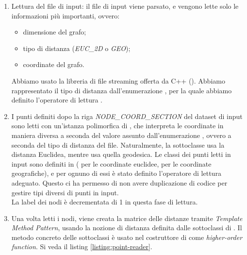 \begin{enumerate}
    \item Lettura del file di input: il file di input viene parsato, e vengono lette solo le informazioni più importanti, ovvero:
    
    \begin{itemize}
        \item dimensione del grafo;
        \item tipo di distanza (\textit{EUC\_2D} o \textit{GEO});
        \item coordinate del grafo.
    \end{itemize}
    
    \noindent Abbiamo usato la libreria di file streaming offerta da C++ (). Abbiamo rappresentato il tipo di distanza dall'enumerazione , per la quale abbiamo definito l'operatore di lettura .
    
    \item I punti definiti dopo la riga \textit{NODE\_COORD\_SECTION} del dataset di input sono letti con un'istanza polimorfica di , che interpreta le coordinate in maniera diversa a seconda del valore assunto dall'enumerazione , ovvero a seconda del tipo di distanza del file. Naturalmente, la sottoclasse  usa la distanza Euclidea, mentre  usa quella geodesica. Le classi dei punti letti in input sono definiti in  ( per le coordinate euclidee,  per le coordinate geografiche), e per ognuno di essi è stato definito l'operatore di lettura  adeguato. Questo ci ha permesso di non avere duplicazione di codice per gestire tipi diversi di punti in input. \\
    
    \noindent La label dei nodi è decrementata di 1 in questa fase di lettura.
    
    \item Una volta letti i nodi, viene creata la matrice delle distanze tramite \textit{Template Method Pattern}, usando la nozione di distanza definita dalle sottoclassi di . Il metodo concreto  delle sottoclassi è usato nel costruttore di  come \textit{higher-order function}. Si veda il listing \ref{listing:point-reader}.
\end{enumerate}

